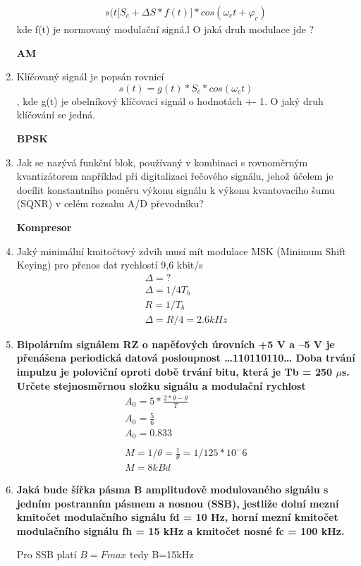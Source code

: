 \begin{enumerate}
     \begin{align*}
s(t\lbrack S_c+\Delta S*f(t)]*cos(\omega_ct+\varphi_c)
     \end{align*} kde f(t) je 
normovaný modulační signá.l O jaká druh modulace jde ?

     \textbf{AM}
    \item Klíčovaný signál je popsán rovnicí
    $$s(t)=g(t)*S_c*cos(\omega_ct)$$, kde g(t) je obelníkový klíčovací signál o hodnotách +- 1. O jaký druh klíčování se jedná.

    \textbf{BPSK}
    \item Jak se nazývá funkční blok, používaný v kombinaci s rovnoměrným kvantizátorem například 
při digitalizaci řečového signálu, jehož účelem je docílit konstantního poměru výkonu signálu 
k výkonu kvantovacího šumu (SQNR) v celém rozsahu A/D převodníku?

\textbf{Kompresor}

    \item Jaký minimální kmitočtový zdvih musí mít modulace MSK (Minimum Shift Keying) pro přenos 
dat rychlostí 9,6 kbit/s
\begin{align*}
    \Delta=? \\
    \Delta=1/4T_b\\
    R=1/T_b \\
    \Delta=R/4=2.6kHz
\end{align*}
    \item \textbf{Bipolárním signálem RZ o napěťových úrovních +5 V a –5 V je přenášena periodická datová 
posloupnost …110110110… Doba trvání impulzu je poloviční oproti době trvání bitu, která je 
Tb = 250 $\mu$s. Určete stejnosměrnou složku signálu a modulační rychlost}
\begin{align*}
    A_0=5*\frac{2*\theta-\theta}{T}\\
     A_0=\frac{5}{6}\\
      A_0=0.833 \\
      \\
      M=1/\theta=\frac{1}{\theta}=1/125*10^-6\\
      M=8kBd
\end{align*}
    \item \textbf{Jaká bude šířka pásma B amplitudově modulovaného signálu s jedním postranním pásmem a 
nosnou (SSB), jestliže dolní mezní kmitočet modulačního signálu fd = 10 Hz, horní mezní 
kmitočet modulačního signálu fh = 15 kHz a kmitočet nosné fc = 100 kHz.}

Pro SSB platí $B=Fmax$ tedy B=15kHz


\end{enumerate}
